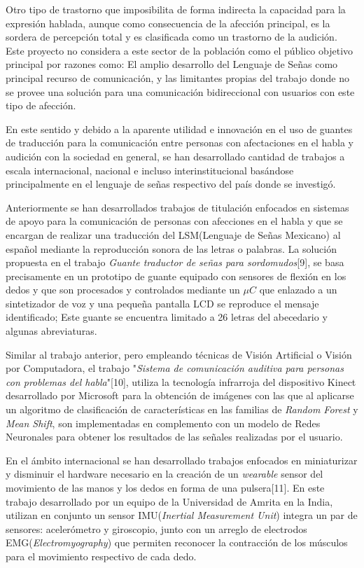 \hfill \break
\justifying
Otro tipo de trastorno que imposibilita de forma indirecta la capacidad para la expresión hablada, aunque como consecuencia de la afección principal, es la sordera de percepción total y es clasificada como un trastorno de la audición. Este proyecto no considera a este sector de la población como el público objetivo principal por razones como: El amplio desarrollo del Lenguaje de Señas como principal recurso de comunicación, y las limitantes propias del trabajo donde no se provee una solución para una comunicación bidireccional con usuarios con este tipo de afección.


\hfill \break
\justifying
En este sentido y debido a la aparente utilidad e innovación en el uso de guantes de traducción para la comunicación entre personas con afectaciones en el habla y audición con la sociedad en general, se han desarrollado cantidad de trabajos a escala internacional, nacional e incluso interinstitucional basándose principalmente en el lenguaje de señas respectivo del país donde se investigó.

%
%
\hfill \break
\justifying
Anteriormente se han desarrollados trabajos de titulación enfocados en sistemas de apoyo para la comunicación de personas con afecciones en el habla y que se encargan de realizar una traducción del LSM(Lenguaje de Señas Mexicano) al español mediante la reproducción sonora de las letras o palabras. La solución propuesta en el trabajo \textit{Guante traductor de señas para sordomudos}[9], se basa precisamente en un prototipo de guante equipado con sensores de flexión en los dedos y que son procesados y controlados mediante un $\mu C$ que enlazado a un sintetizador de voz y una pequeña pantalla LCD se reproduce el mensaje identificado; Este guante se encuentra limitado a 26 letras del abecedario y algunas abreviaturas.

\hfill \break
\justifying
Similar al trabajo anterior, pero empleando técnicas de Visión Artificial o Visión por Computadora, el trabajo "\textit{Sistema de comunicación auditiva para personas con problemas del habla}"[10], utiliza la tecnología infrarroja del dispositivo Kinect desarrollado por Microsoft para la obtención de imágenes con las que al aplicarse un algoritmo de clasificación de características en las familias de \textit{Random Forest} y \textit{Mean Shift}, son implementadas en complemento con un modelo de Redes Neuronales para obtener los resultados de las señales realizadas por el usuario.

\hfill \break
\justifying
En el ámbito internacional se han desarrollado trabajos enfocados en miniaturizar y disminuir el hardware necesario en la creación de un \textit{wearable} sensor del movimiento de las manos y los dedos en forma de una pulsera[11]. En este trabajo desarrollado por un equipo de la Universidad de Amrita en la India, utilizan en conjunto un sensor IMU(\textit{Inertial Measurement Unit}) integra un par de sensores: acelerómetro y giroscopio, junto con un arreglo de electrodos EMG(\textit{Electromyography}) que permiten reconocer la contracción de los músculos para el movimiento respectivo de cada dedo.

